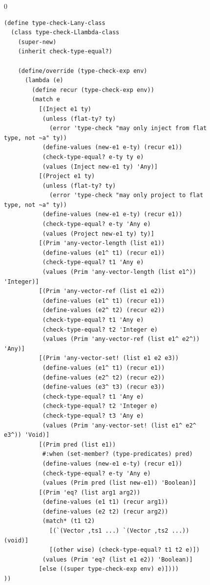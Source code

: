 \documentclass[7x10]{TimesAPriori_MIT}%
\def\racketEd{0}
\def\edition{1}
\numberwithin{theorem}{chapter}
\numberwithin{definition}{chapter}
\numberwithin{equation}{chapter}
\begin{document}
\begin{figure}[btp]
  \begin{tcolorbox}[colback=white]
    {\if\edition\racketEd
\begin{lstlisting}[basicstyle=\ttfamily\footnotesize]
(define type-check-Lany-class
  (class type-check-Llambda-class
    (super-new)
    (inherit check-type-equal?)

    (define/override (type-check-exp env)
      (lambda (e)
        (define recur (type-check-exp env))
        (match e
          [(Inject e1 ty)
           (unless (flat-ty? ty)
             (error 'type-check "may only inject from flat type, not ~a" ty))
           (define-values (new-e1 e-ty) (recur e1))
           (check-type-equal? e-ty ty e)
           (values (Inject new-e1 ty) 'Any)]
          [(Project e1 ty)
           (unless (flat-ty? ty)
             (error 'type-check "may only project to flat type, not ~a" ty))
           (define-values (new-e1 e-ty) (recur e1))
           (check-type-equal? e-ty 'Any e)
           (values (Project new-e1 ty) ty)]
          [(Prim 'any-vector-length (list e1))
           (define-values (e1^ t1) (recur e1))
           (check-type-equal? t1 'Any e)
           (values (Prim 'any-vector-length (list e1^)) 'Integer)]
          [(Prim 'any-vector-ref (list e1 e2))
           (define-values (e1^ t1) (recur e1))
           (define-values (e2^ t2) (recur e2))
           (check-type-equal? t1 'Any e)
           (check-type-equal? t2 'Integer e)
           (values (Prim 'any-vector-ref (list e1^ e2^)) 'Any)]
          [(Prim 'any-vector-set! (list e1 e2 e3))
           (define-values (e1^ t1) (recur e1))
           (define-values (e2^ t2) (recur e2))
           (define-values (e3^ t3) (recur e3))
           (check-type-equal? t1 'Any e)
           (check-type-equal? t2 'Integer e)
           (check-type-equal? t3 'Any e)
           (values (Prim 'any-vector-set! (list e1^ e2^ e3^)) 'Void)]
          [(Prim pred (list e1))
           #:when (set-member? (type-predicates) pred)
           (define-values (new-e1 e-ty) (recur e1))
           (check-type-equal? e-ty 'Any e)
           (values (Prim pred (list new-e1)) 'Boolean)]
          [(Prim 'eq? (list arg1 arg2))
           (define-values (e1 t1) (recur arg1))
           (define-values (e2 t2) (recur arg2))
           (match* (t1 t2)
             [(`(Vector ,ts1 ...) `(Vector ,ts2 ...))   (void)]
             [(other wise) (check-type-equal? t1 t2 e)])
           (values (Prim 'eq? (list e1 e2)) 'Boolean)]
          [else ((super type-check-exp env) e)])))
))
\end{lstlisting}
}
\end{tcolorbox}
\end{figure}
\end{document}
